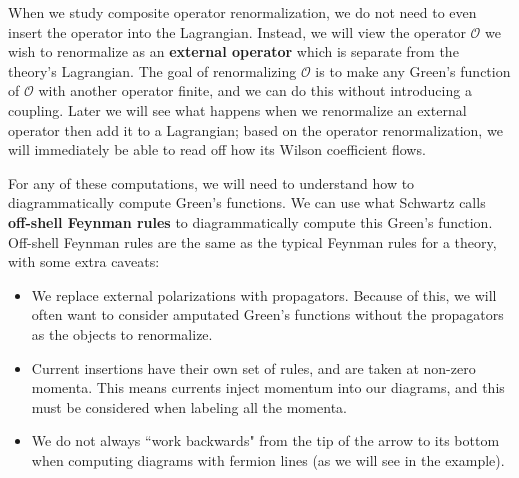 \documentclass[11pt, oneside]{article}   	%
\theoremstyle{definition}
\begin{document}
When we study composite operator renormalization, we do not need to even insert the operator into the Lagrangian. Instead, 
we will view the operator $\mathcal O$ we wish to renormalize as an \textbf{external operator} which is separate from the 
theory's Lagrangian. The goal of renormalizing $\mathcal O$ is to make any Green's function of $\mathcal O$ with another 
operator finite, and we can do this without introducing a coupling. Later we will see what happens when we renormalize 
an external operator then add it to a Lagrangian; based on the operator renormalization, we will immediately be able 
to read off how its Wilson coefficient flows. 

For any of these computations, we will need to understand how to diagrammatically compute Green's functions. We can use 
what Schwartz calls \textbf{off-shell Feynman rules} to diagrammatically compute this Green's function. Off-shell Feynman 
rules are the same as the typical Feynman rules for a theory, with some extra caveats:
\begin{itemize}
	\item We replace external polarizations with propagators. Because of this, we will often want to consider amputated 
	Green's functions without the propagators as the objects to renormalize. 
	\item Current insertions have their own set of rules, and are taken at non-zero momenta. This means currents 
	inject momentum into our diagrams, and this must be considered when labeling all the momenta. 
	\item We do not always ``work backwards" from the tip of the arrow to its bottom when computing diagrams with 
	fermion lines (as we will see in the example). 
\end{itemize}
\end{document}
